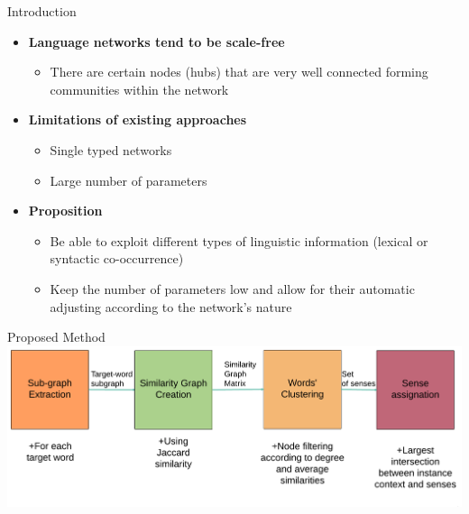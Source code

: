 \documentclass[10pt,=table]{beamer}
\begin{document}
\begin{frame}{Introduction}

	\begin{itemize}
		\item<1-> \large \textbf{Language networks tend to be scale-free}	
			\begin{itemize}
				\item<1-> There are certain nodes (hubs) that are very well connected forming communities within the network
			\end{itemize}
%
		\item<2-> \textbf{Limitations of existing approaches}
		\begin{itemize}
			\item<2-> Single typed networks
			\item<2-> Large number of parameters
		\end{itemize}
		\item<3-> \textbf{Proposition}
		\begin{itemize}
				\item<3-> Be able to exploit different types of linguistic information (lexical or syntactic co-occurrence)
				\item<3-> Keep  the number of parameters low and allow for their automatic adjusting according to the network's nature
		
		\end{itemize}
\end{itemize}
\vspace{\textheight}	
\end{frame}
\begin{frame}{Proposed Method}
  \centering
  \includegraphics[width=1\linewidth]{img/wsd_wsi.png}

\end{frame}
\end{document}
